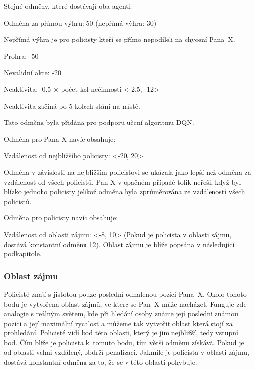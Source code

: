 Stejné odměny, které dostávají oba agenti:
\begin{myitemize}
  \item Odměna za přímou výhru: 50 (nepřímá výhra: 30)
  \begin{myitemize}
    \item Nepřímá výhra je pro policisty kteří se přímo nepodíleli na chycení Pana~X\@.
  \end{myitemize}
  \item Prohra: -50
  \item Nevalidní akce: -20
  \item Neaktivita: -0.5 $\times$ počet kol nečinnosti <-2.5, -12>
  \begin{myitemize}
    \item Neaktivita začíná po 5 kolech stání na místě.
    \item Tato odměna byla přidána pro podporu učení algoritmu DQN\@.
  \end{myitemize}
\end{myitemize}

\bigskip

Odměna pro Pana X navíc obsahuje:
\begin{myitemize}
  \item Vzdálenost od nejbližšího policisty: <-20, 20>
  \begin{myitemize}
    \item Odměna v závislosti na nejbližším policistovi se ukázala jako lepší než odměna za vzdálenost od všech policistů.
    Pan X v opačném případě tolik neřešil když byl blízko jednoho policisty jelikož odměna byla zprůměrována ze vzdáleností všech policistů.
  \end{myitemize}
\end{myitemize}

Odměna pro policisty navíc obsahuje:
\begin{myitemize}
  \item Vzdálenost od oblasti zájmu: <-8, 10> (Pokud je policista v oblasti zájmu, dostává konstantní odměnu 12).
  Oblast zájmu je blíže popsána v následující podkapitole.
\end{myitemize}

\subsubsection{Oblast zájmu}
\label{subsubsec:oblast_zajmu}

Policisté znají s jistotou pouze poslední odhalenou pozici Pana~X\@.
Okolo tohoto bodu je vytvořena oblast zájmů, ve které se Pan~X může nacházet.
Funguje zde analogie s reálným světem, kde při hledání osoby známe její poslední známou pozici a její maximální rychlost a můžeme tak vytvořit oblast která stojí za prohledání.
Policisté vidí bod této oblasti, který je jim nejbližší, tedy vstupní bod.
Čím blíže je policista k~tomuto bodu, tím větší odměnu získává.
Pokud je od oblasti velmi vzdálený, obdrží penalizaci.
Jakmile je policista v oblasti zájmu, dostává konstantní odměnu za to, že se v této oblasti pohybuje.


